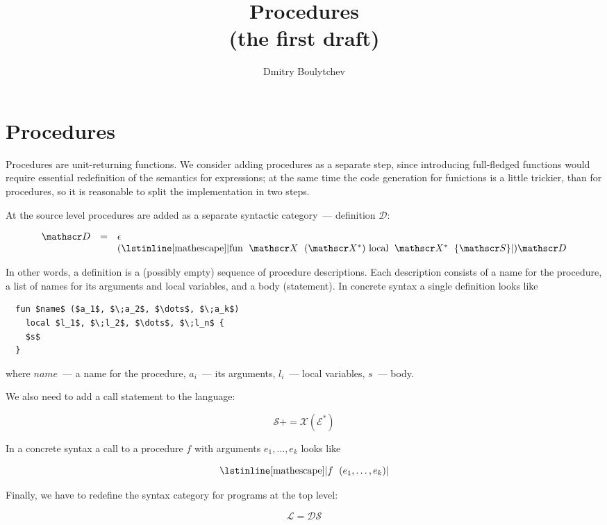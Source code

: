 \documentclass{article}
\title{Procedures\\
  (the first draft)
}
\author{Dmitry Boulytchev}
\newcommand{\llang}[1]{\mbox{\lstinline[mathescape]|#1|}}
\theoremstyle{definition}
\begin{document}
\maketitle

\section{Procedures}

Procedures are unit-returning functions. We consider adding procedures as a separate step, since introducing full-fledged functions would require
essential redefinition of the semantics for expressions; at the same time the code generation for funictions is a little trickier, than for procedures, so
it is reasonable to split the implementation in two steps.

At the source level procedures are added as a separate syntactic category~--- definition $\mathscr D$:

\[
\begin{array}{rcl}
  \mathscr D & = & \epsilon \\
             &   & (\llang{fun $\;\mathscr X\;$ ($\mathscr X^*$) local $\;\mathscr X^*\;$ \{$\mathscr S$\}})\mathscr D
\end{array}
\]

In other words, a definition is a (possibly empty) sequence of procedure descriptions. Each description consists of a name for the procedure, a
list of names for its arguments and local variables, and a body (statement). In concrete syntax a single definition looks like

\begin{lstlisting}
  fun $name$ ($a_1$, $\;a_2$, $\dots$, $\;a_k$)
    local $l_1$, $\;l_2$, $\dots$, $\;l_n$ {
    $s$
  }  
\end{lstlisting}

where $name$~--- a name for the procedure, $a_i$~--- its arguments, $l_i$~--- local variables, $s$~--- body.

We also need to add a call statement to the language:

\[
\mathscr S += \mathscr X (\mathscr E^*)
\]

In a concrete syntax a call to a procedure $f$ with arguments $e_1,\dots,e_k$ looks like

\[
  \llang{$f\;$ ($e_1,\dots,e_k$)}
\]

Finally, we have to redefine the syntax category for programs at the top level:

\[
\mathscr L = \mathscr D\mathscr S
\]
\end{document}
